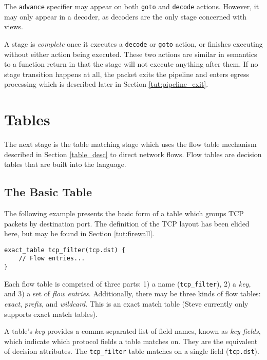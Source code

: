 The \texttt{advance} specifier may appear on both \texttt{goto} and \texttt{decode} actions. However, it may only appear in a decoder, as decoders are the only
stage concerned with views.

A stage is \textit{complete} once it executes a \texttt{decode} or \texttt{goto} action, or
finishes executing without either action being executed. 
These two actions are similar in semantics to a function return
in that the stage will not execute anything after them.
If no stage transition happens at all,
the packet exits the pipeline and enters egress processing which is described later in Section \ref{tut:pipeline_exit}.

\section{Tables} \label{tut:table}

The next stage is the table matching stage which uses the flow table mechanism described in Section \ref{table_desc} to direct network flows. Flow tables are decision tables that are built into the language.

\subsection{The Basic Table} \label{tut:basic_table}

The following example presents the basic form of a table which
groups TCP packets by destination port. The definition of the TCP
layout has been elided here, but may be found in Section \ref{tut:firewall}.

\begin{codepage}
\begin{lstlisting}
exact_table tcp_filter(tcp.dst) {
	// Flow entries...
}
\end{lstlisting}
\end{codepage}

Each flow table is comprised of three parts: 
1) a name (\texttt{tcp\_filter}), 
2) a \textit{key}, and
3) a set of \textit{flow entries}. 
Additionally, there may be three kinds of flow tables: 
\textit{exact}, \textit{prefix}, and \textit{wildcard}. 
This is an exact match table (Steve currently only supports exact
match tables).

A table's \textit{key} provides a comma-separated list of field names, known as
\textit{key fields}, which indicate which protocol fields a table matches on.
They are the equivalent of decision attributes. 
The \texttt{tcp\_filter} table matches on a single field (\texttt{tcp.dst}).

